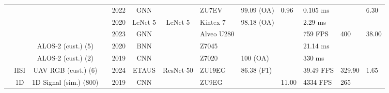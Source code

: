\begin{landscape}
\begin{longtable}{ c c c c c c c M{1.7cm} M{1.05cm} M{1.3cm} M{1.3cm} M{0.8cm} }
 & & & \cite{zhangAccurateLowlatencyEfficient2022a} & 2022 & GNN &  & ZU7EV & 99.09 (OA) & 0.96 & 0.105 ms &  & 6.30 \\
 & & & \cite{chenHardwareImplementationConvolutional2020} & 2020 & LeNet-5 & LeNet-5 & Kintex-7 & 98.18 (OA) &  & 2.29 ms &  &  \\
 & & & \cite{zhangAcceleratingGNNbasedSAR2023} & 2023 & GNN &  & Alveo U280 &  &  & 759 FPS & 400 & 38.00 \\
 & & ALOS-2 (cust.) (5) & \cite{myojinDetectingUncertainBNN2020} & 2020 & BNN &  & Z7045 &  &  & 21.14 ms &  &  \\
 & & ALOS-2 (cust.) (2) & \cite{hashimotoShipClassificationSAR2019a} & 2019 & CNN &  & Z7020 & 100 (OA) &  & 330 ms &  &  \\
 & HSI & UAV RGB (cust.) (6) & \cite{huangEdgeTrustworthyAI2024} & 2024 & ETAUS & ResNet-50 & ZU19EG & 86.38 (F1) &  & 39.49 FPS & 329.90 & 1.65 \\
 & 1D & 1D Signal (sim.) (800) & \cite{pitsisEfficientConvolutionalNeural2019a} & 2019 & CNN &  & ZU9EG &  & 11.00 & 4334 FPS & 265 &  \\
 \midrule
 

\end{longtable}
\end{landscape}

